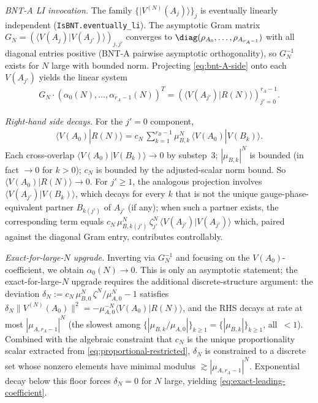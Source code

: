 \documentclass{article}
\newcommand{\leanid}[1]{\texttt{#1}}
\theoremstyle{plain}
\begin{document}
\emph{BNT-A LI invocation.} The family $\{|V^{(N)}(A_j)\rangle\}_j$ is
eventually linearly independent (\leanid{IsBNT.eventually\_li}). The
asymptotic Gram matrix $G_N = (\langle V(A_j)|V(A_{j'})\rangle)_{j,j'}$
converges to $\diag(\rho_{A_0}, \ldots, \rho_{A_{r_A-1}})$ with all
diagonal entries positive (BNT-A pairwise asymptotic orthogonality),
so $G_N^{-1}$ exists for $N$ large with bounded norm. Projecting
\eqref{eq:bnt-A-side} onto each $V(A_{j'})$ yields the linear system
\begin{align}
    G_N \cdot (\alpha_0(N), \ldots, \alpha_{r_A-1}(N))^T
    = (\langle V(A_{j'})|R(N)\rangle)_{j'=0}^{r_A-1}.
\end{align}

\emph{Right-hand side decays.} For the $j' = 0$ component,
\begin{align}
    \langle V(A_0)|R(N)\rangle
    = c_N\,\sum_{k=1}^{r_B-1} \mu_{B,k}^N\,\langle V(A_0)|V(B_k)\rangle.
\end{align}
Each cross-overlap $\langle V(A_0)|V(B_k)\rangle \to 0$ by substep~3;
$|\mu_{B,k}|^N$ is bounded (in fact $\to 0$ for $k > 0$); $c_N$ is
bounded by the adjusted-scalar norm bound. So $\langle V(A_0)|R(N)
    \rangle \to 0$. For $j' \ge 1$, the analogous projection involves
$\langle V(A_{j'})|V(B_k)\rangle$, which decays for every $k$ that is
not the unique gauge-phase-equivalent partner $B_{k(j')}$ of $A_{j'}$
(if any); when such a partner exists, the corresponding term equals
$c_N\,\mu_{B,k(j')}^N\,\zeta_{j'}^N\,\langle V(A_{j'})|V(A_{j'})\rangle$
which, paired against the diagonal Gram entry, contributes
controllably.

\emph{Exact-for-large-$N$ upgrade.} Inverting via $G_N^{-1}$ and
focusing on the $V(A_0)$-coefficient, we obtain $\alpha_0(N) \to 0$.
This is only an asymptotic statement; the exact-for-large-$N$ upgrade
requires the additional discrete-structure argument: the deviation
$\delta_N := c_N\,\mu_{B,0}^N\,\zeta^N / \mu_{A,0}^N - 1$ satisfies
$\delta_N \|V^{(N)}(A_0)\|^2 = -\mu_{A,0}^{-N} \langle V(A_0)|R(N)
    \rangle$, and the RHS decays at rate at most $|\mu_{A,r_A-1}|^N$
(the slowest among $\{|\mu_{B,k}/\mu_{A,0}|\}_{k\ge 1} = \{|\mu_{B,k}|\}_{k\ge 1}$,
all~$<1$). Combined with the algebraic constraint that $c_N$ is the
unique proportionality scalar extracted from
\eqref{eq:proportional-restricted}, $\delta_N$ is constrained to a
discrete set whose nonzero elements have minimal modulus $\gtrsim
    |\mu_{A,r_A-1}|^N$. Exponential decay below this floor forces
$\delta_N = 0$ for $N$ large, yielding
\eqref{eq:exact-leading-coefficient}.
\end{document}

